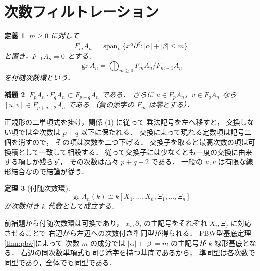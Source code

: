 \documentclass[a5paper,10pt,onecolumn]{jsarticle}
\makeatletter
\theoremstyle{mathnotetheorem}
\newtheorem{theorem}{定理}[section]
\newtheorem{definition}[theorem]{定義}
\newtheorem{lemma}[theorem]{補題}
\renewcommand{\proofname}{証明}
\renewenvironment{proof}[1][\proofname]{%
  \par\pushQED{\qed}\normalfont\topsep4\p@\@plus2\p@\relax
  \trivlist\item[\hskip\labelsep\bfseries #1]\ignorespaces
}{\popQED\endtrivlist\@endpefalse}
\makeatother
\begin{document}
\section{次数フィルトレーション}
\begin{definition}
$m\ge0$ に対して
\[
 F_mA_n=\operatorname{span}_k
 \{x^\alpha\partial^\beta:|\alpha|+|\beta|\le m\}
\]
と置き，$F_{-1}A_n=0$ とする．
\[
 \operatorname{gr}A_n=
 \bigoplus_{m\ge0}F_mA_n/F_{m-1}A_n
\]
を付随次数環という．
\end{definition}
\begin{lemma}
$F_pA_n\cdot F_qA_n\subset F_{p+q}A_n$ である．
さらに $u\in F_pA_n$，$v\in F_qA_n$ なら
$[u,v]\in F_{p+q-2}A_n$ である
（負の添字の $F_m$ は零とする）．
\end{lemma}
\begin{proof}
正規形の二単項式を掛け，関係 (1) に従って
乗法記号を左へ移すと，
交換しない項では全次数は $p+q$ 以下に保たれる．
交換によって現れる定数項は記号二個を消すので，
その項は次数を二つ下げる．
交換子を取ると最高次数の項は可換積として一致して相殺する．
従って交換子には少なくとも一度の交換に由来する項しか残らず，
その次数は高々 $p+q-2$ である．
一般の $u,v$ は有限な線形結合なので結論が従う．
\end{proof}
\begin{theorem}[付随次数環]\label{thm:gr}
\[
 \operatorname{gr}A_n(k)\cong
 k[X_1,\ldots,X_n,\Xi_1,\ldots,\Xi_n]
\]
が次数付き $k$-代数として成立する．
\end{theorem}
\begin{proof}
前補題から付随次数環は可換であり，
$x_i,\partial_j$ の主記号をそれぞれ
$X_i,\Xi_j$ に対応させることで
右辺から左辺への次数付き準同型が得られる．
PBW型基底定理\ref{thm:pbw}によって
次数 $m$ の成分では
$|\alpha|+|\beta|=m$ の主記号が $k$-線形基底となる．
右辺の同次数単項式も同じ添字を持つ基底であるから，
準同型は各次数で同型であり，全体でも同型である．
\end{proof}
\end{document}
